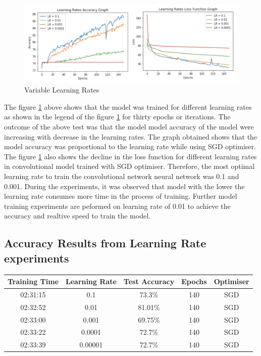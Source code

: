 \begin{figure}[!htp]
    \centering
    \includegraphics[width=15cm]{Images/lr.png}
    \caption{Variable Learning Rates}
    \label{fig:lrates}
\end{figure}

The figure \ref{fig:lrates} above shows that the model was trained for different learning rates as shown
in the legend of the figure \ref{fig:lrates} for thirty epochs or iterations. The outcome of the above test 
was that the model model accuracy of the model were increasing with decrease in the learning rates. 
The graph obtained shows that the model accuracy was proportional to the learning rate while using SGD optimiser. 
The figure \ref{fig:lrates} also shows the decline in the loss function for different learning rates in 
convolutional model trained with SGD optimiser. Therefore, the most optimal learning rate to train the convolutional network 
neural network was 0.1 and 0.001. During the experiments, it was observed that model with the lower the learning rate consumes more time in the 
process of training. Further model training experiments are peformed on 
learning rate of 0.01 to achieve the accuracy and realtive speed to train the model.
\pagebreak

\subsection*{Accuracy Results from Learning Rate experiments}

\begin{center}
    \begin{tabular} { | c | c | c | c | c |}
        \hline
        Training Time & Learning Rate & Test Accuracy & Epochs  & Optimiser\\ 
        \hline
        02:31:15 & 0.1 & 73.3\% & 140 & SGD \\ 
        \hline 
        02:32:52 & 0.01 & 81.01\% & 140 & SGD  \\
        \hline 
        02:33:00 & 0.001 & 69.75\% & 140 & SGD \\
        \hline
        02:33:22 & 0.0001 & 72.7\% & 140 & SGD \\
        \hline
        02:33:39 & 0.00001 & 72.7\% & 140 & SGD \\
        \hline
    \end{tabular}
\end{center}

